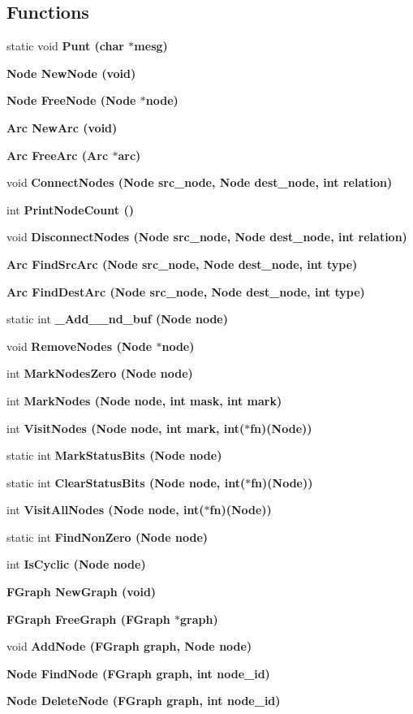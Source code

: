 \subsection*{Functions}
\begin{CompactItemize}
\item 
static void \bf{Punt} (char $\ast$mesg)
\item 
\bf{Node} \bf{New\-Node} (void)
\item 
\bf{Node} \bf{Free\-Node} (\bf{Node} $\ast$\bf{node})
\item 
\bf{Arc} \bf{New\-Arc} (void)
\item 
\bf{Arc} \bf{Free\-Arc} (\bf{Arc} $\ast$arc)
\item 
void \bf{Connect\-Nodes} (\bf{Node} src\_\-node, \bf{Node} dest\_\-node, int relation)
\item 
int \bf{Print\-Node\-Count} ()
\item 
void \bf{Disconnect\-Nodes} (\bf{Node} src\_\-node, \bf{Node} dest\_\-node, int relation)
\item 
\bf{Arc} \bf{Find\-Src\-Arc} (\bf{Node} src\_\-node, \bf{Node} dest\_\-node, int type)
\item 
\bf{Arc} \bf{Find\-Dest\-Arc} (\bf{Node} src\_\-node, \bf{Node} dest\_\-node, int type)
\item 
static int \bf{\_\-Add\_\_\-nd\_\-buf} (\bf{Node} \bf{node})
\item 
void \bf{Remove\-Nodes} (\bf{Node} $\ast$\bf{node})
\item 
int \bf{Mark\-Nodes\-Zero} (\bf{Node} \bf{node})
\item 
int \bf{Mark\-Nodes} (\bf{Node} \bf{node}, int mask, int mark)
\item 
int \bf{Visit\-Nodes} (\bf{Node} \bf{node}, int mark, int($\ast$fn)(\bf{Node}))
\item 
static int \bf{Mark\-Status\-Bits} (\bf{Node} \bf{node})
\item 
static int \bf{Clear\-Status\-Bits} (\bf{Node} \bf{node}, int($\ast$fn)(\bf{Node}))
\item 
int \bf{Visit\-All\-Nodes} (\bf{Node} \bf{node}, int($\ast$fn)(\bf{Node}))
\item 
static int \bf{Find\-Non\-Zero} (\bf{Node} \bf{node})
\item 
int \bf{Is\-Cyclic} (\bf{Node} \bf{node})
\item 
\bf{FGraph} \bf{New\-Graph} (void)
\item 
\bf{FGraph} \bf{Free\-Graph} (\bf{FGraph} $\ast$\bf{graph})
\item 
void \bf{Add\-Node} (\bf{FGraph} \bf{graph}, \bf{Node} \bf{node})
\item 
\bf{Node} \bf{Find\-Node} (\bf{FGraph} \bf{graph}, int node\_\-id)
\item 
\bf{Node} \bf{Delete\-Node} (\bf{FGraph} \bf{graph}, int node\_\-id)
\end{CompactItemize}
